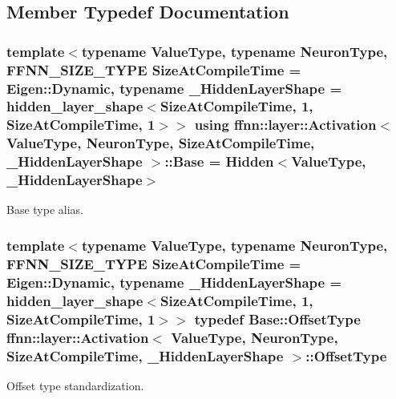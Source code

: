 \subsection{Member Typedef Documentation}
\hypertarget{classffnn_1_1layer_1_1_activation_a2f462178d98a5439e13962796c483459}{
\subsubsection[{Base}]{\setlength{\rightskip}{0pt plus 5cm}template$<$typename Value\-Type, typename Neuron\-Type, F\-F\-N\-N\-\_\-\-S\-I\-Z\-E\-\_\-\-T\-Y\-P\-E Size\-At\-Compile\-Time = Eigen\-::\-Dynamic, typename \-\_\-\-Hidden\-Layer\-Shape = hidden\-\_\-layer\-\_\-shape$<$\-Size\-At\-Compile\-Time, 1, Size\-At\-Compile\-Time, 1$>$$>$ using {\bf ffnn\-::layer\-::\-Activation}$<$ Value\-Type, Neuron\-Type, Size\-At\-Compile\-Time, \-\_\-\-Hidden\-Layer\-Shape $>$\-::{\bf Base} =  {\bf Hidden}$<$Value\-Type, \-\_\-\-Hidden\-Layer\-Shape$>$}}\label{classffnn_1_1layer_1_1_activation_a2f462178d98a5439e13962796c483459}


Base type alias. 

\hypertarget{classffnn_1_1layer_1_1_activation_aac891b2d2a76bcf6035f53ed6abb94dc}{
\subsubsection[{Offset\-Type}]{\setlength{\rightskip}{0pt plus 5cm}template$<$typename Value\-Type, typename Neuron\-Type, F\-F\-N\-N\-\_\-\-S\-I\-Z\-E\-\_\-\-T\-Y\-P\-E Size\-At\-Compile\-Time = Eigen\-::\-Dynamic, typename \-\_\-\-Hidden\-Layer\-Shape = hidden\-\_\-layer\-\_\-shape$<$\-Size\-At\-Compile\-Time, 1, Size\-At\-Compile\-Time, 1$>$$>$ typedef {\bf Base\-::\-Offset\-Type} {\bf ffnn\-::layer\-::\-Activation}$<$ Value\-Type, Neuron\-Type, Size\-At\-Compile\-Time, \-\_\-\-Hidden\-Layer\-Shape $>$\-::{\bf Offset\-Type}}}\label{classffnn_1_1layer_1_1_activation_aac891b2d2a76bcf6035f53ed6abb94dc}


Offset type standardization. 

